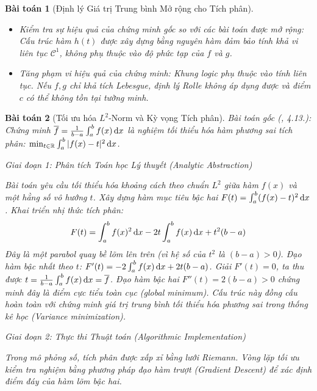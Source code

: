 \documentclass{article}
\newtheorem{baitoan}{Bài toán}
\begin{document}
\begin{baitoan}[Định lý Giá trị Trung bình Mở rộng cho Tích phân]
\begin{itemize}
 \item \textit{Kiểm tra sự hiệu quả của chứng minh gốc so với các bài toán được mở rộng}: Cấu trúc hàm $h(t)$ được xây dựng bằng nguyên hàm đảm bảo tính khả vi liên tục $\mathcal{C}^1$, không phụ thuộc vào độ phức tạp của $f$ và $g$.
 \item \textit{Tăng phạm vi hiệu quả của chứng minh}: Khung logic phụ thuộc vào tính liên tục. Nếu $f, g$ chỉ khả tích Lebesgue, định lý Rolle không áp dụng được và điểm $c$ có thể không tồn tại tường minh.
 \end{itemize}
\end{baitoan}


\begin{baitoan}[Tối ưu hóa $L^2$-Norm và Kỳ vọng Tích phân]
 \emph{Bài toán gốc (\cite{Quoc_Long_Dat_Nam_VMC}, 4.13.):} 
 Chứng minh $\overline{f} = \frac{1}{b - a}\int_a^b f(x)\,{\rm d}x$ là nghiệm tối thiểu hóa hàm phương sai tích phân: $\min_{t\in\mathbb{R}} \int_a^b |f(x) - t|^2\,{\rm d}x$.

\vspace{0.5em}\noindent\emph{Giai đoạn 1: Phân tích Toán học Lý thuyết (Analytic Abstraction)}
 
 Bài toán yêu cầu tối thiểu hóa khoảng cách theo chuẩn $L^2$ giữa hàm $f(x)$ và một hằng số vô hướng $t$. Xây dựng hàm mục tiêu bậc hai $F(t) = \int_a^b (f(x) - t)^2\,{\rm d}x$. Khai triển nhị thức tích phân:
 \begin{equation}
 F(t) = \int_a^b f(x)^2\,{\rm d}x - 2t \int_a^b f(x)\,{\rm d}x + t^2 (b - a)
 \end{equation}
 Đây là một parabol quay bề lõm lên trên (vì hệ số của $t^2$ là $(b-a) > 0$). Đạo hàm bậc nhất theo $t$:
 $F'(t) = -2 \int_a^b f(x)\,{\rm d}x + 2t(b-a)$.
 Giải $F'(t) = 0$, ta thu được $t = \frac{1}{b-a}\int_a^b f(x)\,{\rm d}x = \overline{f}$. Đạo hàm bậc hai $F''(t) = 2(b-a) > 0$ chứng minh đây là điểm cực tiểu toàn cục (global minimum). Cấu trúc này đồng cấu hoàn toàn với chứng minh giá trị trung bình tối thiểu hóa phương sai trong thống kê học (Variance minimization).

\vspace{0.5em}\noindent\emph{Giai đoạn 2: Thực thi Thuật toán (Algorithmic Implementation)}
 
 Trong mô phỏng số, tích phân được xấp xỉ bằng lưới Riemann. Vòng lặp tối ưu kiểm tra nghiệm bằng phương pháp đạo hàm trượt (Gradient Descent) để xác định điểm đáy của hàm lõm bậc hai.


\end{baitoan}
\end{document}
